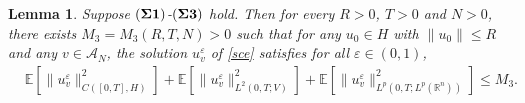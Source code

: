 \documentclass[11pt]{article}
\numberwithin{equation}{section}
\theoremstyle{plain}
\newtheorem{lemma}{Lemma}[section]
\def\leq{\leqslant}
\begin{document}
 \begin{lemma}\label{pre-h2}
    Suppose  $({\bf \Sigma 1})$-$({\bf \Sigma 3})$ hold.
    Then for every $R>0$, $T>0$ and $N>0$,
    there exists $M_3 = M_3 (R,T,N) > 0$ such that for any $u_0 \in H$ with $\| u_0 \| \leq R$
    and any $v \in \mathcal{A}_N$,
    the solution $u_v^\varepsilon$ of \eqref{sce}
    satisfies for all $\varepsilon \in (0,1)$,
    \begin{align}\label{bound}
        & \mathbb{E} \left[ \| u_v^\varepsilon \|^2_{C([0,T],H)} \right]
        + \mathbb{E} \left[ \| u_v^\varepsilon \|^2_{L^2(0,T; V)} \right]
        + \mathbb{E} \left[ \| u_v^\varepsilon \|^2_{L^p(0,T; L^p(\mathbb{R}^n) )} \right]
        \leq  M_3.
    \end{align}
 \end{lemma}
\end{document}
